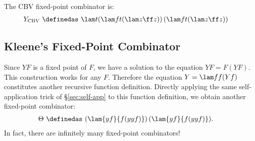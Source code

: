 The CBV fixed-point combinator is:
\begin{align*}
Y_{\text{CBV}}\ &\definedas\ \lam t{(\lam f{t(\lam z{\ff z})})\,(\lam f{t(\lam z{\ff z})})}
\end{align*}

\subsection{Kleene's Fixed-Point Combinator}

Since $YF$ is a fixed point of $F$,
we have a solution to the equation $YF = F(YF)$. This construction works for any $F$.
Therefore the equation $Y = \lam f{f(Yf)}$ constitutes another recursive function
definition. Directly applying the same self-application trick of
\S\ref{sec:self-app} to this function definition, we obtain another fixed-point combinator:
\begin{align*}
\Theta\ &\definedas\ (\lam{yf}{f(yyf)})\,(\lam{yf}{f(yyf)}).
\end{align*}
In fact, there are infinitely many fixed-point combinators!
